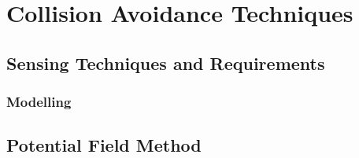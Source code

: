 	
\section{Collision Avoidance Techniques}

	\subsection{Sensing Techniques and Requirements}
	
		\subsubsection{Modelling}
		
	\subsection{Potential Field Method}
	
	
	
	
	
	
	
	
	
	
	
	
	
	
	
